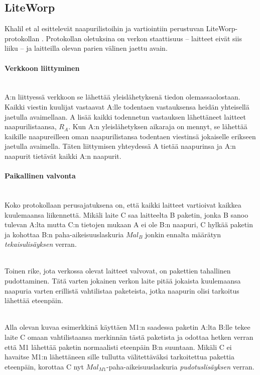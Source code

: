 \documentclass[finnish]{tktltiki2}
\theoremstyle{definition}
\theoremstyle{remark}
\begin{document}
\subsection{LiteWorp}

Khalil et al esittelevät naapurilistoihin ja vartiointiin perustuvan LiteWorp-protokollan \cite{liteworp}. Protokollan oletuksina on verkon staattisuus -- laitteet eivät siis liiku -- ja laitteilla olevan parien välinen jaettu avain.

\paragraph{Verkkoon liittyminen}
\noindent \\
A:n liittyessä verkkoon se lähettää yleislähetyksenä tiedon olemassaolostaan. Kaikki viestin kuulijat vastaavat A:lle todentaen vastauksensa heidän yhteisellä jaetulla avaimellaan. A lisää kaikki todennetun vastauksen lähettäneet laitteet naapurilistaansa, $R_A$. Kun A:n yleislähetyksen aikaraja on mennyt, se lähettää kaikille naapureilleen oman naapurilistansa todentaen viestinsä jokaiselle erikseen jaetulla avaimella. Täten liittymisen yhteydessä A tietää naapurinsa ja A:n naapurit tietävät kaikki A:n naapurit.

\paragraph{Paikallinen valvonta}
\noindent \\
Koko protokollaan perusajatuksena on, että kaikki laitteet vartioivat kaikkea kuulemaansa liikennettä. Mikäli laite C saa laitteelta B paketin, jonka B sanoo tulevan A:lta mutta C:n tietojen mukaan A ei ole B:n naapuri, C hylkää paketin ja kohottaa B:n paha-aikeisuuslaskuria $Mal_B$ jonkin ennalta määrätyn \emph{tekaisulisäyksen} verran.

\noindent \\
Toinen rike, jota verkossa olevat laitteet valvovat, on pakettien tahallinen pudottaminen. Tätä varten jokainen verkon laite pitää jokaista kuulemaansa naapuria varten erillistä vahtilistaa paketeista, jotka naapurin olisi tarkoitus lähettää eteenpäin. 

\noindent \\
Alla olevan kuvaa esimerkkinä käyttäen M1:n saadessa paketin A:lta B:lle tekee laite C omaan vahtilistaansa merkinnän tästä paketista ja odottaa hetken verran että M1 lähettää paketin normaalisti eteenpäin B:n suuntaan. Mikäli C ei havaitse M1:n lähettäneen sille tullutta välitettäväksi tarkoitettua pakettia eteenpäin, korottaa C nyt $Mal_{M1}$-paha-aikeisuuslaskuria \emph{pudotuslisäyksen} verran.
\end{document}
